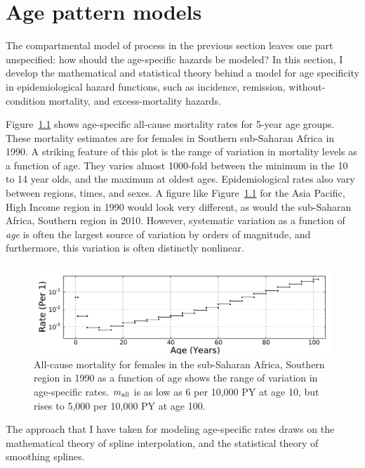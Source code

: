 \chapter{Age pattern models}
\label{theory-age_pattern_model}
The compartmental model of process in the previous section leaves one
part unspecified: how should the age-specific hazards be modeled?  In
this section, I develop the mathematical and statistical theory behind
a model for age specificity in epidemiological hazard functions, such as
incidence, remission, without-condition mortality, and
excess-mortality hazards.

Figure~\ref{ssas-mx_female_1990} shows age-specific all-cause
mortality rates for 5-year age groups.  These mortality estimates are
for females in Southern sub-Saharan Africa in 1990.  A striking
feature of this plot is the range of variation in mortality levels as
a function of age.  They varies almost 1000-fold between the minimum
in the 10 to 14 year olds, and the maximum at oldest
ages. Epidemiological rates also vary between regions, times, and
sexes.  A figure like Figure~\ref{ssas-mx_female_1990} for the Asia
Pacific, High Income region in 1990 would look very different, as
would the sub-Saharan Africa, Southern region in 2010. However,
systematic variation as a function of \emph{age} is often the largest
source of variation by orders of magnitude, and furthermore, this
variation is often distinctly nonlinear.

\begin{figure}[h]
\begin{center}
\includegraphics[width=\textwidth]{ssas-mx_female_1990.pdf}
\caption{All-cause mortality for females in the sub-Saharan Africa,
  Southern region in 1990 as a function of age shows the range of
  variation in age-specific rates.  $m_{\text{all}}$ is as low as 6 per
  10,000 PY at age 10, but rises to 5,000 per 10,000 PY at age 100.}
\label{ssas-mx_female_1990}
\end{center}
\end{figure}

The approach that I have taken for modeling age-specific rates draws
on the mathematical theory of spline interpolation, and the
statistical theory of smoothing splines.

